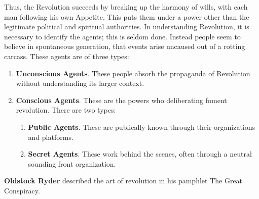 Thus, the Revolution succeeds by breaking up the harmony of wills, with each man following his own Appetite. This puts them under a power other than the legitimate political and spiritual authorities. In understanding Revolution, it is necessary to identify the agents; this is seldom done. Instead people seem to believe in spontaneous generation, that events arise uncaused out of a rotting carcass. These agents are of three types:

\begin{enumerate}


\item \textbf{Unconscious Agents}. These people absorb the propaganda of Revolution without understanding its larger context.

\item \textbf{Conscious Agents}. These are the powers who deliberating foment revolution. There are two types:

  \begin{enumerate}

  \def\labelenumii{\alph{enumii}.}

  
\item \textbf{Public Agents}. These are publically known through their organizations and platforms.
  
\item \textbf{Secret Agents}. These work behind the scenes, often through a neutral sounding front organization.
  \end{enumerate}

\end{enumerate}


\textbf{Oldstock Ryder} described the art of revolution in his pamphlet The Great Conspiracy.

